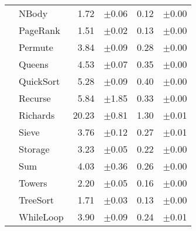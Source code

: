 \begin{tabular}{ll@{\hspace{6pt}}r@{\hspace{3pt}}l@{\hspace{6pt}}r@{\hspace{3pt}}l}
 & NBody & 1.72 & \scriptsize\textcolor{gray!60}{$\pm$0.06} & 0.12 & \scriptsize\textcolor{gray!60}{$\pm$0.00} \\
 & PageRank & 1.51 & \scriptsize\textcolor{gray!60}{$\pm$0.02} & 0.13 & \scriptsize\textcolor{gray!60}{$\pm$0.00} \\
 & Permute & 3.84 & \scriptsize\textcolor{gray!60}{$\pm$0.09} & 0.28 & \scriptsize\textcolor{gray!60}{$\pm$0.00} \\
 & Queens & 4.53 & \scriptsize\textcolor{gray!60}{$\pm$0.07} & 0.35 & \scriptsize\textcolor{gray!60}{$\pm$0.00} \\
 & QuickSort & 5.28 & \scriptsize\textcolor{gray!60}{$\pm$0.09} & 0.40 & \scriptsize\textcolor{gray!60}{$\pm$0.00} \\
 & Recurse & 5.84 & \scriptsize\textcolor{gray!60}{$\pm$1.85} & 0.33 & \scriptsize\textcolor{gray!60}{$\pm$0.00} \\
 & Richards & 20.23 & \scriptsize\textcolor{gray!60}{$\pm$0.81} & 1.30 & \scriptsize\textcolor{gray!60}{$\pm$0.01} \\
 & Sieve & 3.76 & \scriptsize\textcolor{gray!60}{$\pm$0.12} & 0.27 & \scriptsize\textcolor{gray!60}{$\pm$0.01} \\
 & Storage & 3.23 & \scriptsize\textcolor{gray!60}{$\pm$0.05} & 0.22 & \scriptsize\textcolor{gray!60}{$\pm$0.00} \\
 & Sum & 4.03 & \scriptsize\textcolor{gray!60}{$\pm$0.36} & 0.26 & \scriptsize\textcolor{gray!60}{$\pm$0.00} \\
 & Towers & 2.20 & \scriptsize\textcolor{gray!60}{$\pm$0.05} & 0.16 & \scriptsize\textcolor{gray!60}{$\pm$0.00} \\
 & TreeSort & 1.71 & \scriptsize\textcolor{gray!60}{$\pm$0.03} & 0.13 & \scriptsize\textcolor{gray!60}{$\pm$0.00} \\
 & WhileLoop & 3.90 & \scriptsize\textcolor{gray!60}{$\pm$0.09} & 0.24 & \scriptsize\textcolor{gray!60}{$\pm$0.01} \\
\bottomrule
\end{tabular}